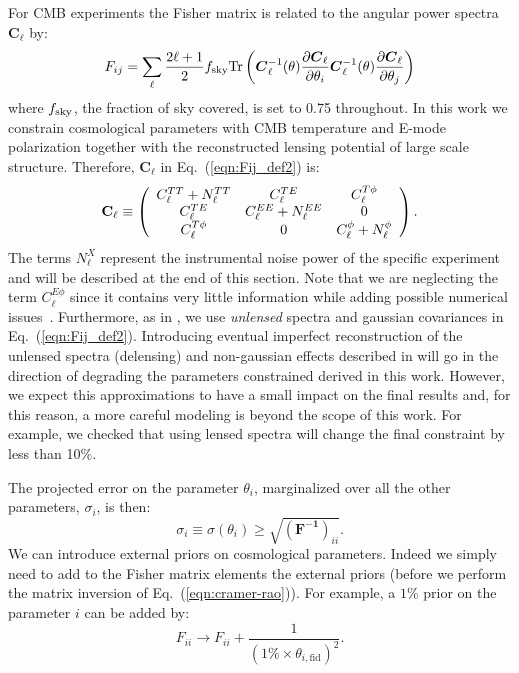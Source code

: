 \documentclass[aps,prd,reprint,superscriptaddress]{revtex4-1}
\newcommand\refeq[1]{Eq.~(\ref{eqn:#1})}
\begin{document}
For CMB experiments the Fisher matrix is related to the angular power spectra $\boldsymbol{C}_\ell$ by:
\begin{equation}
 F_{ij} = \sum_\ell \frac{2\ell+1}{2} f_{\rm sky} {\rm Tr} \left(  \boldsymbol{C}^{-1}_\ell( \theta) \frac{\partial \boldsymbol{C}_\ell}{\partial \theta_i} \boldsymbol{C}^{-1}_\ell( \theta) \frac{\partial \boldsymbol{C}_\ell}{\partial \theta_j}  \right)
 \label{eqn:Fij_def2}
 \end{equation}
 where $f_{\rm sky}$, the fraction of sky covered, is set to 0.75 throughout.
In this work we constrain cosmological parameters with CMB temperature and E-mode polarization together with the reconstructed lensing potential of large scale structure. Therefore, $\boldsymbol{C}_\ell$ in \refeq{Fij_def2} is:
 \begin{eqnarray}
 	\centering
		\mathbf{C}_\ell \equiv \left( \begin{array}{ccc}C_\ell^{TT} + N_\ell^{TT} & C_\ell^{TE} & C_\ell^{T\phi} \\ C_\ell^{TE} & C_\ell^{EE} + N_\ell^{EE} & 0 \\ C_\ell^{T\phi} & 0 & C_\ell^{\phi} + N_\ell^{\phi}\end{array}\right).
	\label{eqn:cov_definition}
\end{eqnarray}
The terms $N_\ell^{X}$ represent the instrumental noise power of the specific experiment and will be described at the end of this section.
Note that we are neglecting the term $C_\ell^{E\phi}$ since it  contains very little information while adding possible numerical issues~\cite{wu:2014,2013PhRvD..87h3008H}.
Furthermore, as in \cite{wu:2014}, we use \textit{unlensed} spectra and gaussian covariances in \refeq{Fij_def2}. 
Introducing eventual imperfect reconstruction of the unlensed spectra (delensing) and non-gaussian effects described in \cite{benoit-levy:2012} will go in the direction of degrading the parameters constrained derived in this work.
However, we expect this approximations to have a small impact on the final results and, for this reason, a more careful modeling is beyond the scope of this work. For example, we checked that using lensed spectra will change the final constraint by less than 10$\%$.

The projected error on the parameter $\theta_i$, marginalized over all the other parameters, $\sigma_i$, is then:
\begin{equation}
\sigma_i \equiv \sigma (\theta_i) \geq \sqrt{(\mathbf{ F^{-1}})_{ii}}.
\label{eqn:cramer-rao}
\end{equation}
We can introduce external priors on cosmological parameters.
Indeed we simply need to add to the Fisher matrix elements the external priors (before we perform the matrix inversion of \refeq{cramer-rao}).
For example, a $1\%$ prior on the parameter $i$ can be added by:
\begin{equation}
F_{ii} \rightarrow F_{ii} + \frac{1}{(1\% \times  \theta_{i,\text{fid}})^2}.
\end{equation}
\end{document}
